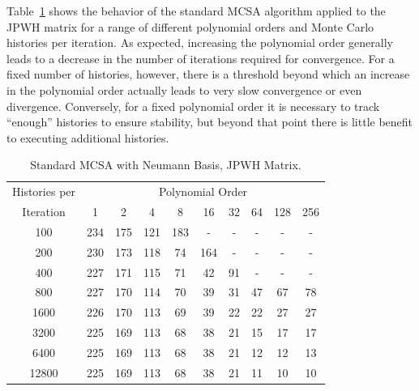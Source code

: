\documentclass[10pt]{article}
\begin{document}
Table~\ref{tab:jpwh_standard_neumann} shows the behavior of
the standard MCSA algorithm applied to the JPWH matrix for a range
of different polynomial orders and Monte Carlo histories per iteration.
As expected, increasing the polynomial order generally leads to a decrease
in the number of iterations required for convergence.
For a fixed number of histories, however, there is a threshold beyond
which an increase in the polynomial order actually leads to very slow
convergence or even divergence.  Conversely, for a fixed polynomial order
it is necessary to track ``enough'' histories to ensure stability, but
beyond that point there is little benefit to executing additional histories.
\begin{table}
\caption{Standard MCSA with Neumann Basis, JPWH Matrix.
\label{tab:jpwh_standard_neumann}}
\centering
\begin{tabular}{cccccccccc}
\toprule
Histories per & \multicolumn{9}{c}{Polynomial Order} \\
Iteration & 1 & 2 & 4 & 8 & 16 & 32 & 64 & 128 & 256 \\
\midrule
100 & 234 & 175 & 121 & 183 & - & - & - & - & - \\
200 & 230 & 173 & 118 & 74 & 164 & - & - & - & - \\
400 & 227 & 171 & 115 & 71 & 42 & 91 & - & - & - \\
800 & 227 & 170 & 114 & 70 & 39 & 31 & 47 & 67 & 78 \\
1600 & 226 & 170 & 113 & 69 & 39 & 22 & 22 & 27 & 27 \\
3200 & 225 & 169 & 113 & 68 & 38 & 21 & 15 & 17 & 17 \\
6400 & 225 & 169 & 113 & 68 & 38 & 21 & 12 & 12 & 13 \\
12800 & 225 & 169 & 113 & 68 & 38 & 21 & 11 & 10 & 10 \\
\bottomrule
\end{tabular}
\end{table}
\end{document}
